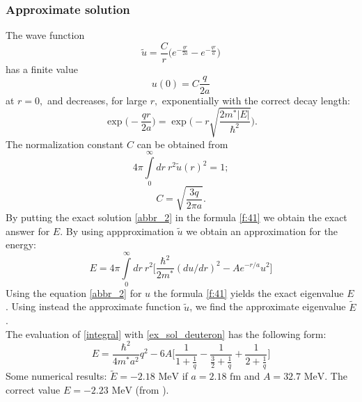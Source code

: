 \documentclass[a4paper, 12pt]{article}
\begin{document}
\subsubsection{Approximate solution}
The wave function
$$\widetilde{u} = \frac{C}{r}\displaystyle{\big(e^{-\frac{qr}{2a}} - e^{-\frac{qr}{a}}\big)} $$
has a finite value
$$u(0) = C\frac{q}{2a}$$
at $r=0,$ and decreases, for large $r,$ exponentially with the correct decay length:
$$\exp\bigg(-\frac{qr}{2a}\bigg) = \exp\bigg(-r \sqrt{\frac{2 m^* |E|}{\hbar^2}}\bigg).$$
The normalization constant $C$ can be obtained from 
$$4 \pi \displaystyle{\int\limits_{0}^ {\infty}} dr~ r^2 \widetilde{u}(r)^2 = 1;$$
\begin{equation}\label{f:41}
    C = \sqrt{\frac{3q}{2 \pi a}}.
\end{equation}
By putting the exact solution \eqref{abbr_2} in the formula \eqref{f:41} we obtain the exact answer for $E$. By using appproximation $\widetilde{u}$ we obtain an approximation for the energy:
\begin{equation}\label{integral}
    E = 4 \pi \int\limits_{0}^{\infty} dr ~r^2 \bigg[\frac{\hbar^2}{2 m^*}(du/dr)^2 -A e ^{-r/a} u^2\bigg]
\end{equation}
Using the equation \eqref{abbr_2}  for $u$ the formula \eqref{f:41} yields the exact eigenvalue $E$. Using instead the approximate function $\widetilde{u}$, we find the approximate eigenvalue $\widetilde{E}$.\\
The evaluation of \eqref{integral} with \eqref{ex_sol_deuteron} has the following form:
\begin{equation}
    E = \frac{\hbar^2}{4 m^* a^2}q^2 - 6 A \bigg[\frac{1}{1 + \frac{1}{q}} - \frac{1}{\frac{3}{2} + \frac{1}{q}} +  \frac{1}{2 + \frac{1}{q}} \bigg]
\end{equation}
Some numerical results: $\widetilde{E}=-2.18 \text{ MeV}$ if $a = 2.18 \text{ fm}$ and $A = 32.7 \text{ MeV}$. The correct value $E = -2.23 \text{ MeV}$ (from \cite{griffiths2016introduction}).
\end{document}
